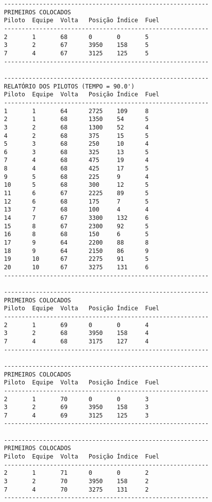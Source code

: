 \documentclass[12pt]{article}
\begin{document}
\begin{verbatim}
----------------------------------------------------------
PRIMEIROS COLOCADOS
Piloto  Equipe  Volta   Posição Índice  Fuel
----------------------------------------------------------
2       1       68      0       0       5
3       2       67      3950    158     5
7       4       67      3125    125     5
----------------------------------------------------------

----------------------------------------------------------
RELATÓRIO DOS PILOTOS (TEMPO = 90.0')
Piloto  Equipe  Volta   Posição Índice  Fuel
----------------------------------------------------------
1       1       64      2725    109     8
2       1       68      1350    54      5
3       2       68      1300    52      4
4       2       68      375     15      5
5       3       68      250     10      4
6       3       68      325     13      5
7       4       68      475     19      4
8       4       68      425     17      5
9       5       68      225     9       4
10      5       68      300     12      5
11      6       67      2225    89      5
12      6       68      175     7       5
13      7       68      100     4       4
14      7       67      3300    132     6
15      8       67      2300    92      5
16      8       68      150     6       5
17      9       64      2200    88      8
18      9       64      2150    86      9
19      10      67      2275    91      5
20      10      67      3275    131     6
----------------------------------------------------------

----------------------------------------------------------
PRIMEIROS COLOCADOS
Piloto  Equipe  Volta   Posição Índice  Fuel
----------------------------------------------------------
2       1       69      0       0       4
3       2       68      3950    158     4
7       4       68      3175    127     4
----------------------------------------------------------

----------------------------------------------------------
PRIMEIROS COLOCADOS
Piloto  Equipe  Volta   Posição Índice  Fuel
----------------------------------------------------------
2       1       70      0       0       3
3       2       69      3950    158     3
7       4       69      3125    125     3
----------------------------------------------------------

----------------------------------------------------------
PRIMEIROS COLOCADOS
Piloto  Equipe  Volta   Posição Índice  Fuel
----------------------------------------------------------
2       1       71      0       0       2
3       2       70      3950    158     2
7       4       70      3275    131     2
----------------------------------------------------------


\end{verbatim}
\end{document}
